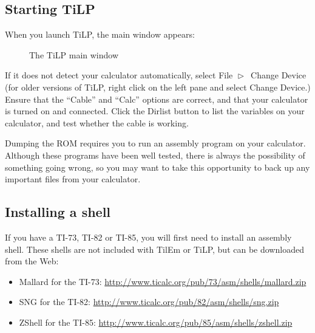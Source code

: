 \documentclass[10pt]{report}
\newcommand{\submenu}{$\vartriangleright$}
\begin{document}
\subsection*{Starting TiLP}
When you launch TiLP, the main window appears:
\begin{figure}[H]
\centering
{}
\caption{The TiLP main window}
\end{figure}

If it does not detect your calculator automatically, select
\textsf{File} \submenu\ \textsf{Change Device} (for older versions of
TiLP, right click on the left pane and select \textsf{Change Device}.)
Ensure that the ``Cable'' and ``Calc'' options are correct, and that
your calculator is turned on and connected.  Click the
\textsf{Dirlist} button to list the variables on your calculator, and
test whether the cable is working.

Dumping the ROM requires you to run an assembly program on your
calculator.  Although these programs have been well tested, there is
always the possibility of something going wrong, so you may want to
take this opportunity to back up any important files from your
calculator.

\subsection*{Installing a shell}
If you have a TI-73, TI-82 or TI-85, you will first need to install an
assembly shell.  These shells are not included with TilEm or TiLP, but
can be downloaded from the Web:
\begin{itemize}\raggedright
\item Mallard for the TI-73: \url{http://www.ticalc.org/pub/73/asm/shells/mallard.zip}
\item SNG for the TI-82: \url{http://www.ticalc.org/pub/82/asm/shells/sng.zip}
\item ZShell for the TI-85: \url{http://www.ticalc.org/pub/85/asm/shells/zshell.zip}
\end{itemize}
\end{document}
